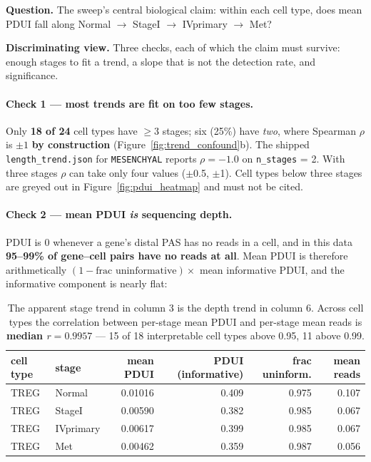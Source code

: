 \documentclass[11pt,a4paper]{article}
\begin{document}
\textbf{Question.} The sweep's central biological claim: within each cell type,
does mean PDUI fall along Normal $\rightarrow$ StageI $\rightarrow$ IVprimary
$\rightarrow$ Met?

\textbf{Discriminating view.} Three checks, each of which the claim must survive:
enough stages to fit a trend, a slope that is not the detection rate, and
significance.

\paragraph{Check 1 --- most trends are fit on too few stages.}
Only \textbf{18 of 24} cell types have $\geq$3 stages; six (25\%) have
\emph{two}, where Spearman $\rho$ is $\pm 1$ \textbf{by construction}
(Figure~\ref{fig:trend_confound}b). The shipped \texttt{length\_trend.json} for
\texttt{MESENCHYAL} reports $\rho = -1.0$ on \texttt{n\_stages} = 2. With three
stages $\rho$ can take only four values ($\pm$0.5, $\pm$1). Cell types below three
stages are greyed out in Figure~\ref{fig:pdui_heatmap} and must not be cited.

\paragraph{Check 2 --- mean PDUI \emph{is} sequencing depth.}
PDUI is 0 whenever a gene's distal PAS has no reads in a cell, and in this data
\textbf{95--99\% of gene--cell pairs have no reads at all}. Mean PDUI is therefore
arithmetically $(1 - \text{frac uninformative}) \times$ mean informative PDUI, and
the informative component is nearly flat:

\begin{table}[htbp]
  \centering
  \small
  \begin{tabular}{llrrrr}
    \toprule
    cell type & stage & mean PDUI & PDUI (informative) & frac uninform. & mean reads \\
    \midrule
    TREG & Normal     & 0.01016 & 0.409 & 0.975 & 0.107 \\
    TREG & StageI     & 0.00590 & 0.382 & 0.985 & 0.067 \\
    TREG & IVprimary  & 0.00617 & 0.399 & 0.985 & 0.067 \\
    TREG & Met        & 0.00462 & 0.359 & 0.987 & 0.056 \\
    \bottomrule
  \end{tabular}
  \caption{The apparent stage trend in column 3 is the depth trend in column 6.
    Across cell types the correlation between per-stage mean PDUI and per-stage
    mean reads is \textbf{median $r = 0.9957$} --- 15 of 18 interpretable cell
    types above 0.95, 11 above 0.99.}
  \label{tab:pdui_depth}
\end{table}
\end{document}

